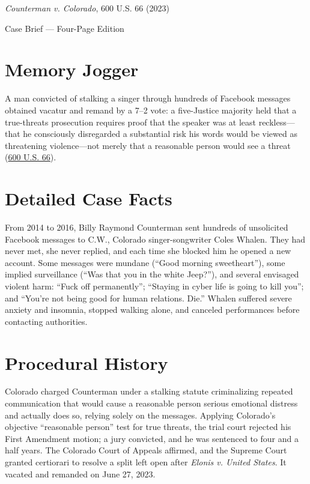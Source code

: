 \documentclass[12pt]{article}
\begin{document}
\begin{center}
{\LARGE \textit{Counterman v. Colorado}, 600 U.S. 66 (2023)\par}
\vspace{0.8em}
{\large Case Brief --- Four-Page Edition\par}
\end{center}
\vspace{1em}

\section{Memory Jogger}

A man convicted of stalking a singer through hundreds of Facebook messages obtained vacatur and remand by a 7--2 vote: a five-Justice majority held that a true-threats prosecution requires proof that the speaker was at least reckless---that he consciously disregarded a substantial risk his words would be viewed as threatening violence---not merely that a reasonable person would see a threat (\href{https://supreme.justia.com/cases/federal/us/600/22-138/}{600 U.S. 66}).

\section{Detailed Case Facts}

From 2014 to 2016, Billy Raymond Counterman sent hundreds of unsolicited Facebook messages to C.W., Colorado singer-songwriter Coles Whalen. They had never met, she never replied, and each time she blocked him he opened a new account. Some messages were mundane (``Good morning sweetheart''), some implied surveillance (``Was that you in the white Jeep?''), and several envisaged violent harm: ``Fuck off permanently''; ``Staying in cyber life is going to kill you''; and ``You're not being good for human relations. Die.'' Whalen suffered severe anxiety and insomnia, stopped walking alone, and canceled performances before contacting authorities.

\section{Procedural History}

Colorado charged Counterman under a stalking statute criminalizing repeated communication that would cause a reasonable person serious emotional distress and actually does so, relying solely on the messages. Applying Colorado's objective ``reasonable person'' test for true threats, the trial court rejected his First Amendment motion; a jury convicted, and he was sentenced to four and a half years. The Colorado Court of Appeals affirmed, and the Supreme Court granted certiorari to resolve a split left open after \textit{Elonis v. United States}. It vacated and remanded on June 27, 2023.
\end{document}
